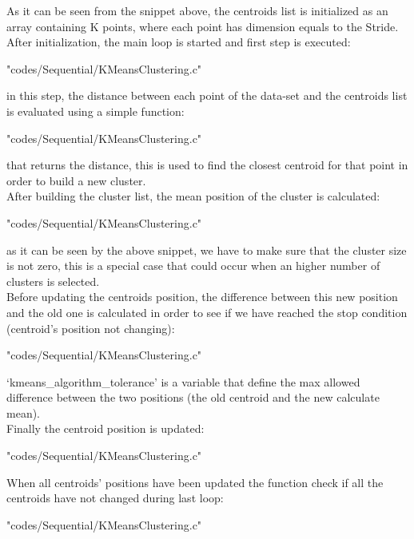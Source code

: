 \documentclass[10pt,twocolumn,letterpaper]{article}
\begin{document}
As it can be seen from the snippet above, the centroids list is initialized as an array containing K points, where each point has 
dimension equals to the Stride.\\

After initialization, the main loop is started and first step is executed:\\

\begin{lstinputlisting}[language=C,style=CSnippetStyle,caption=Minimum Distance Calculation,firstline=69,lastline=78 ]{
	"codes/Sequential/KMeansClustering.c"}
\end{lstinputlisting}

in this step, the distance between each point of the data-set and the centroids list is evaluated using a simple function:\\
\begin{lstinputlisting}[language=C,style=CSnippetStyle,caption=Distance Calculation,firstline=9,lastline=19 ]{
	"codes/Sequential/KMeansClustering.c"}
\end{lstinputlisting}
that returns the distance, this is used to find the closest centroid for that point in order to build a new cluster.\\
After building the cluster list, the mean position of the cluster is calculated:\\
\begin{lstinputlisting}[language=C,style=CSnippetStyle,caption=Distance Calculation,firstline=81,lastline=99 ]{
	"codes/Sequential/KMeansClustering.c"}
\end{lstinputlisting}
as it can be seen by the above snippet, we have to make sure that the cluster size is not zero, this is a special case that could occur
when an higher number of clusters is selected.\\
Before updating the centroids position, the difference between this new position and the old one is calculated in order to see if we 
have reached the stop condition (centroid's position not changing):\\
\begin{lstinputlisting}[language=C,style=CSnippetStyle,caption=Distance Calculation,firstline=100,lastline=108 ]{
	"codes/Sequential/KMeansClustering.c"}
\end{lstinputlisting}
`kmeans\_algorithm\_tolerance' is a variable that define the max allowed difference between the two positions (the old centroid and the
new calculate mean).\\
Finally the centroid position is updated:\\
\begin{lstinputlisting}[language=C,style=CSnippetStyle,caption=Distance Calculation,firstline=109,lastline=109]{
	"codes/Sequential/KMeansClustering.c"}
\end{lstinputlisting}
When all centroids' positions have been updated the function check if all the centroids have not changed during last loop:\\
\begin{lstinputlisting}[language=C,style=CSnippetStyle,caption=Distance Calculation,firstline=111,lastline=113]{
	"codes/Sequential/KMeansClustering.c"}
\end{lstinputlisting}
\end{document}
